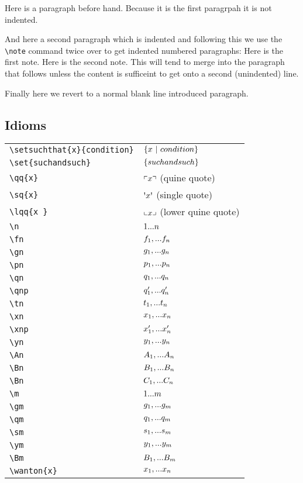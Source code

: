 \documentclass[10pt,a4paper]{article}
\begin{document}
Here is a paragraph before hand. Because it is the first paragrpah it is not indented.

And here a second paragraph which is indented and following this we use the \verb'\note' command twice over to get indented numbered paragraphs:
\note Here is the first note.
\note Here is the second note. This will tend to merge into the paragraph that follows unless the content is sufficeint to get onto a second (unindented) line.

Finally here we revert to a normal blank line introduced paragraph.

\subsection{Idioms}

\begin{tabular}{|l|p{4cm}|}
\hline
\verb!\setsuchthat{x}{condition}! & $\left\{x \ \middle|\ condition\right\}$\\
\verb!\set{suchandsuch}!&$\left\{suchandsuch\right\}$\\
\verb!\qq{x} ! & $\left\ulcorner x\right\urcorner$ (quine quote)\\
\verb!\sq{x} ! & $\sq{x}$ (single quote)\\
\verb!\lqq{x }! & $\left\llcorner x\right\lrcorner$ (lower quine quote)\\
\verb!\n  !&$   1...n $\\
\verb!\fn !&$   f_1,...f_n$\\
\verb!\gn !&$   g_1,...g_n$\\
\verb!\pn !&$   p_1,...p_n$\\
\verb!\qn !&$   q_1,...q_n$\\
\verb!\qnp !&$  q'_1,...q'_n$\\
\verb!\tn !&$   t_1,...t_n$\\
\verb!\xn !&$   x_1,...x_n$\\
\verb!\xnp !&$  x'_1,...x'_n$\\
\verb!\yn !&$   y_1,...y_n$\\
\verb!\An !&$   A_1,...A_n$\\
\verb!\Bn !&$   B_1,...B_n$\\
\verb!\Bn !&$   C_1,...C_n$\\
\verb!\m  !&$   1...m $\\
\verb!\gm !&$   g_1,...g_m$\\
\verb!\qm !&$   q_1,...q_m$\\
\verb!\sm !&$   s_1,...s_m$\\
\verb!\ym !&$   y_1,...y_m$\\
\verb!\Bm !&$   B_1,...B_m$\\
\verb!\wanton{x} !&$ x_1,...x_n$\\

\end{tabular}
\end{document}
